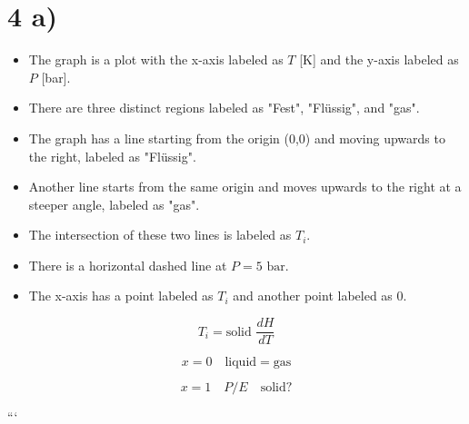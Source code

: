 \section*{4 a)}

\begin{itemize}
    \item The graph is a plot with the x-axis labeled as $T$ [\textdegree K] and the y-axis labeled as $P$ [bar].
    \item There are three distinct regions labeled as "Fest", "Flüssig", and "gas".
    \item The graph has a line starting from the origin (0,0) and moving upwards to the right, labeled as "Flüssig".
    \item Another line starts from the same origin and moves upwards to the right at a steeper angle, labeled as "gas".
    \item The intersection of these two lines is labeled as $T_i$.
    \item There is a horizontal dashed line at $P = 5 \text{ bar}$.
    \item The x-axis has a point labeled as $T_i$ and another point labeled as $0$.
\end{itemize}

\[
T_i = \text{solid } \frac{dH}{dT}
\]

\[
x = 0 \quad \text{liquid} = \text{gas}
\]

\[
x = 1 \quad P/E \quad \text{solid?}
\]

```